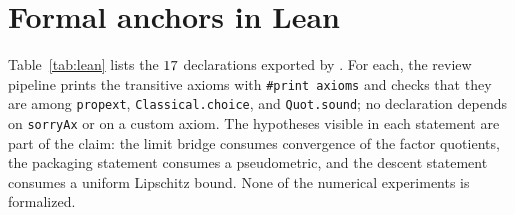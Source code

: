 \section{Formal anchors in Lean}
\label{app:formal}

Table~\ref{tab:lean} lists the $17$ declarations exported by .
For each, the review pipeline prints the transitive axioms with \texttt{\#print axioms} and checks that they are among \texttt{propext}, \texttt{Classical.choice}, and \texttt{Quot.sound}; no declaration depends on \texttt{sorryAx} or on a custom axiom.
The hypotheses visible in each statement are part of the claim: the limit bridge consumes convergence of the factor quotients, the packaging statement consumes a pseudometric, and the descent statement consumes a uniform Lipschitz bound.
None of the numerical experiments is formalized.


